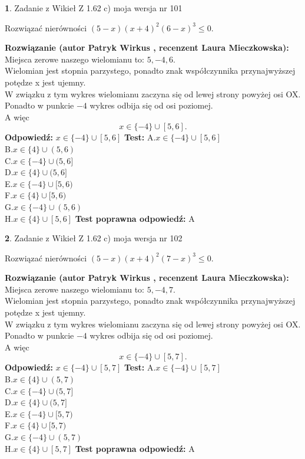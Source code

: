 \documentclass[12pt, a4paper]{article}
\theoremstyle{definition} %
\newtheorem{zad}{}
\newcommand{\zadStart}[1]{\begin{zad}#1\newline}
\newcommand{\zadStop}{\end{zad}}
\newcommand{\rozwStart}[2]{\noindent \textbf{Rozwiązanie (autor #1 , recenzent #2): }\newline}
\newcommand{\rozwStop}{\newline}
\newcommand{\odpStart}{\noindent \textbf{Odpowiedź:}\newline}
\newcommand{\odpStop}{\newline}
\newcommand{\testStart}{\noindent \textbf{Test:}\newline}
\newcommand{\testStop}{\newline}
\newcommand{\kluczStart}{\noindent \textbf{Test poprawna odpowiedź:}\newline}
\newcommand{\kluczStop}{\newline}
\begin{document}
\zadStart{Zadanie z Wikieł Z 1.62 c) moja wersja nr 101}

Rozwiązać nierówności $(5-x)(x+4)^{2}(6-x)^{3}\le0$.
\zadStop
\rozwStart{Patryk Wirkus}{Laura Mieczkowska}
Miejsca zerowe naszego wielomianu to: $5, -4, 6$.\\
Wielomian jest stopnia parzystego, ponadto znak współczynnika przy\linebreak najwyższej potędze x jest ujemny.\\ W związku z tym wykres wielomianu zaczyna się od lewej strony powyżej osi OX.\\
Ponadto w punkcie $-4$ wykres odbija się od osi poziomej.\\
A więc $$x \in \{-4\} \cup [5,6].$$
\rozwStop
\odpStart
$x \in \{-4\} \cup [5,6]$
\odpStop
\testStart
A.$x \in \{-4\} \cup [5,6]$\\
B.$x \in \{4\} \cup (5,6)$\\
C.$x \in \{-4\} \cup (5,6]$\\
D.$x \in \{4\} \cup (5,6]$\\
E.$x \in \{-4\} \cup [5,6)$\\
F.$x \in \{4\} \cup [5,6)$\\
G.$x \in \{-4\} \cup (5,6)$\\
H.$x \in \{4\} \cup [5,6]$
\testStop
\kluczStart
A
\kluczStop



\zadStart{Zadanie z Wikieł Z 1.62 c) moja wersja nr 102}

Rozwiązać nierówności $(5-x)(x+4)^{2}(7-x)^{3}\le0$.
\zadStop
\rozwStart{Patryk Wirkus}{Laura Mieczkowska}
Miejsca zerowe naszego wielomianu to: $5, -4, 7$.\\
Wielomian jest stopnia parzystego, ponadto znak współczynnika przy\linebreak najwyższej potędze x jest ujemny.\\ W związku z tym wykres wielomianu zaczyna się od lewej strony powyżej osi OX.\\
Ponadto w punkcie $-4$ wykres odbija się od osi poziomej.\\
A więc $$x \in \{-4\} \cup [5,7].$$
\rozwStop
\odpStart
$x \in \{-4\} \cup [5,7]$
\odpStop
\testStart
A.$x \in \{-4\} \cup [5,7]$\\
B.$x \in \{4\} \cup (5,7)$\\
C.$x \in \{-4\} \cup (5,7]$\\
D.$x \in \{4\} \cup (5,7]$\\
E.$x \in \{-4\} \cup [5,7)$\\
F.$x \in \{4\} \cup [5,7)$\\
G.$x \in \{-4\} \cup (5,7)$\\
H.$x \in \{4\} \cup [5,7]$
\testStop
\kluczStart
A
\kluczStop
\end{document}
